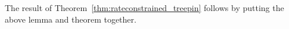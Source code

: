 The result of Theorem~\ref{thm:rateconstrained_treepin} follows by putting the above lemma and theorem together.





% 



